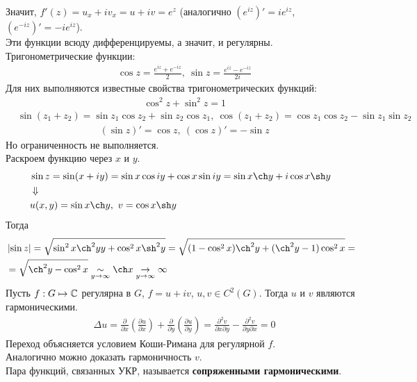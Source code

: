 Значит, $f'(z) = u_x + iv_x = u+iv = e^z$ (аналогично $(e^{iz})' = ie^{iz}$,
$(e^{-iz})' = -ie^{iz}$).
\\
Эти функции всюду дифференцируемы, а значит, и регулярны.
\Def
Тригонометрические функции:
\begin{align*}
  & \cos z = \frac{e^{iz} + e^{-iz}}{2}, \ \sin z = \frac{e^{iz} -e^{-iz}}{2i}
\end{align*}
Для них выполняются известные свойства тригонометрических функций:
\begin{align*}
  & \cos^2 z + \sin^2 z = 1
\end{align*}
\begin{align*}
  & \sin(z_1+z_2) = \sin z_1 \cos z_2 + \sin z_2 \cos z_1, \ \cos(z_1+z_2) = \cos z_1 \cos z_2 - \sin z_1 \sin z_2
\end{align*}
\begin{align*}
  & \left( \sin z \right)' = \cos z, \ \left( \cos z \right)' = - \sin z
\end{align*}
Но ограниченность не выполняется.
\\
Раскроем функцию через $x$ и $y$.
\begin{align*}
  & \sin z = \sin(x+iy) = \sin x \cos iy + \cos x \sin iy = \sin x \ch y + i \cos x \sh y \\
  & \Downarrow \\
  & u(x,y) = \sin x \ch y, \ v = \cos x \sh y
\end{align*}
Тогда
\begin{align*}
  & \left| \sin z \right| = \sqrt{\sin^2 x \ch^2 yy + \cos^2 x \sh^2 y} = \sqrt{(1-\cos^2 x)\ch^2 y + (\ch^2 y - 1)\cos^2 x} = \\
  & = \sqrt{\ch^2 y - \cos^2 x} \us{y \to \infty}{\sim} \ch x \us{y \to \infty}{\to} \infty
\end{align*}
\theorem
Пусть $f: G \mapsto \mathbb{C}$ регулярна в $G$, $f = u + iv$, $u,v \in C^2(G)$. Тогда
$u$ и $v$ являются гармоническими.
\pr
\begin{align*}
  & \Delta u = \frac{\partial}{\partial x}\left( \frac{\partial u}{\partial x} \right)+ \frac{\partial}{\partial y} \left( \frac{\partial u}{\partial y} \right) = \frac{\partial^2 v}{\partial x \partial y} - \frac{\partial^2 v}{\partial y \partial x} = 0
\end{align*}
Переход объясняется условием Коши-Римана для регулярной $f$.
\\
Аналогично можно доказать гармоничность $v$.
\\
Пара функций, связанных УКР, называется \textbf{сопряженными гармоническими}.
